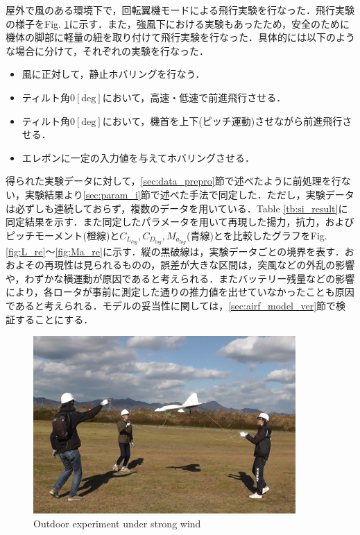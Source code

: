 屋外で風のある環境下で，回転翼機モードによる飛行実験を行なった．飛行実験の様子をFig. \ref{fig:flight_ex}に示す．また，強風下における実験もあったため，安全のために機体の脚部に軽量の紐を取り付けて飛行実験を行なった．具体的には以下のような場合に分けて，それぞれの実験を行なった．

\begin{itemize}
\item[(1)]風に正対して，静止ホバリングを行なう．
\item[(2)]ティルト角$0\mathrm{[deg]}$において，高速・低速で前進飛行させる．
\item[(3)]ティルト角$0\mathrm{[deg]}$において，機首を上下(ピッチ運動)させながら前進飛行させる．
\item[(4)]エレボンに一定の入力値を与えてホバリングさせる．
\end{itemize}

得られた実験データに対して，\ref{sec:data_prepro}節で述べたように前処理を行ない，実験結果より\ref{sec:param_i}節で述べた手法で同定した．ただし，実験データは必ずしも連続しておらず，複数のデータを用いている．Table \ref{tb:si_result}に同定結果を示す．また同定したパラメータを用いて再現した揚力，抗力，およびピッチモーメント(橙線)と$C_{L_{log}},C_{D_{log}},M_{a_{log}}$(青線)とを比較したグラフをFig. \ref{fig:L_re}〜\ref{fig:Ma_re}に示す．縦の黒破線は，実験データごとの境界を表す．おおよその再現性は見られるものの，誤差が大きな区間は，突風などの外乱の影響や，わずかな横運動が原因であると考えられる．またバッテリー残量などの影響により，各ロータが事前に測定した通りの推力値を出せていなかったことも原因であると考えられる．モデルの妥当性に関しては，\ref{sec:airf_model_ver}節で検証することにする．

\begin{figure}[H]
  \begin{center}
    \includegraphics[clip,width=10cm,bb=0 0 1123 762]{./z_figure_files/chapter4/experiment.jpeg}
    \caption{Outdoor experiment under strong wind}
    \label{fig:flight_ex}
  \end{center}
\end{figure}

